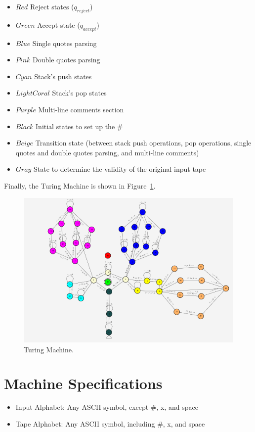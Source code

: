 \documentclass{article}
\begin{document}
\begin{itemize}
    \item $Red$ Reject states ($q_{reject}$)
    \item $Green$ Accept state ($q_{accept}$)
    \item $Blue$ Single quotes parsing
    \item $Pink$ Double quotes parsing
    \item $Cyan$ Stack's push states  
    \item $Light Coral$ Stack's pop states
    \item $Purple$ Multi-line comments section 
    \item $Black$ Initial states to set up the $\#$
    \item $Beige$ Transition state (between stack push operations, pop operations, single quotes and double quotes parsing, and multi-line comments)
    \item $Gray$ State to determine the validity of the original input tape
\end{itemize}

Finally, the Turing Machine is shown in Figure\ \ref{fig:stackqueue}.
\begin{figure}
    \includegraphics[width=\linewidth]{stackqueue.png}
    \caption{Turing Machine.}\label{fig:stackqueue}
\end{figure}


\section{Machine Specifications}

\begin{itemize}
    \item Input Alphabet: Any ASCII symbol, except #, x, and space
    \item Tape Alphabet:  Any ASCII symbol, including #, x, and space
\end{itemize}
\end{document}
